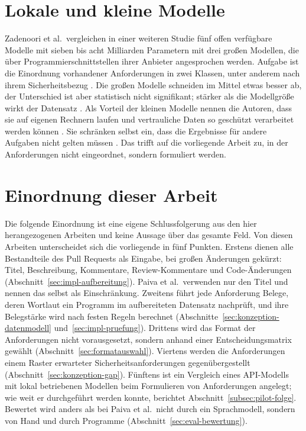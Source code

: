 \documentclass[11pt,a4paper]{report}
\begin{document}
\section{Lokale und kleine Modelle}
\label{sec:vw-modellgroesse}

Zadenoori et al.\ vergleichen in einer weiteren Studie fünf offen
verfügbare Modelle mit sieben bis acht Milliarden Parametern mit drei
großen Modellen, die über Programmierschnittstellen ihrer Anbieter
angesprochen werden. Aufgabe ist die Einordnung vorhandener
Anforderungen in zwei Klassen, unter anderem nach ihrem Sicherheitsbezug
\cite[Abschn.~2]{zadenoori2025size}. Die großen Modelle schneiden im
Mittel etwas besser ab, der Unterschied ist aber statistisch nicht
signifikant; stärker als die Modellgröße wirkt der Datensatz
\cite[Abschn.~3]{zadenoori2025size}. Als Vorteil der kleinen Modelle
nennen die Autoren, dass sie auf eigenen Rechnern laufen und
vertrauliche Daten so geschützt verarbeitet werden können
\cite[Abschn.~1]{zadenoori2025size}. Sie schränken selbst ein, dass die
Ergebnisse für andere Aufgaben nicht gelten müssen
\cite[Abschn.~3]{zadenoori2025size}. Das trifft auf die vorliegende
Arbeit zu, in der Anforderungen nicht eingeordnet, sondern formuliert
werden.

\section{Einordnung dieser Arbeit}
\label{sec:vw-einordnung}

Die folgende Einordnung ist eine eigene Schlussfolgerung aus den hier
herangezogenen Arbeiten und keine Aussage über das gesamte Feld. Von
diesen Arbeiten unterscheidet sich die vorliegende in fünf Punkten.
Erstens dienen alle Bestandteile des Pull Requests als Eingabe, bei
großen Änderungen gekürzt: Titel, Beschreibung,
Kommentare, Review-Kommentare und Code-Änderungen
(Abschnitt~\ref{sec:impl-aufbereitung}). Paiva et al.\ verwenden nur den
Titel und nennen das selbst als Einschränkung. Zweitens führt jede
Anforderung Belege, deren Wortlaut ein Programm im aufbereiteten
Datensatz nachprüft,
und ihre Belegstärke wird nach festen Regeln berechnet
(Abschnitte~\ref{sec:konzeption-datenmodell}
und~\ref{sec:impl-pruefung}). Drittens wird das Format der Anforderungen
nicht vorausgesetzt, sondern anhand einer Entscheidungsmatrix gewählt
(Abschnitt~\ref{sec:formatauswahl}). Viertens werden die Anforderungen
einem Raster erwarteter Sicherheitsanforderungen gegenübergestellt
(Abschnitt~\ref{sec:konzeption-gap}). Fünftens ist ein Vergleich eines
API-Modells mit lokal betriebenen Modellen beim Formulieren von
Anforderungen angelegt; wie weit er durchgeführt werden konnte, berichtet
Abschnitt~\ref{subsec:pilot-folge}. Bewertet wird anders als bei Paiva
et al.\ nicht durch ein Sprachmodell, sondern von Hand und durch
Programme (Abschnitt~\ref{sec:eval-bewertung}).
\end{document}
